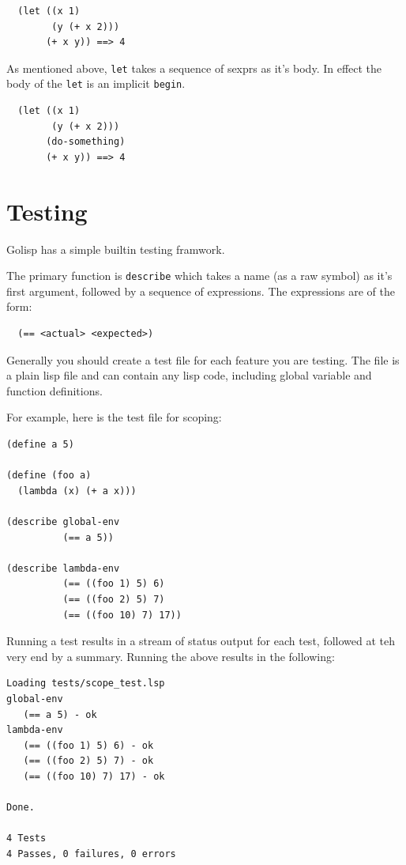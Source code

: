 \documentclass[12pt]{article}
\begin{document}
\begin{verbatim}
  (let ((x 1)
        (y (+ x 2)))
       (+ x y)) ==> 4
\end{verbatim}

As mentioned above, \verb|let| takes a sequence of sexprs as it's
body. In effect the body of the \verb|let| is an implicit
\verb|begin|.

\begin{verbatim}
  (let ((x 1)
        (y (+ x 2)))
       (do-something)
       (+ x y)) ==> 4
\end{verbatim}

\section{Testing}

Golisp has a simple builtin testing framwork.

The primary function is \verb|describe| which takes a name (as a raw
symbol) as it's first argument, followed by a sequence of expressions.
The expressions are of the form:

\begin{verbatim}
  (== <actual> <expected>)
\end{verbatim}

Generally you should create a test file for each feature you are
testing. The file is a plain lisp file and can contain any lisp code,
including global variable and function definitions.

For example, here is the test file for scoping:

\begin{verbatim}
(define a 5)

(define (foo a)
  (lambda (x) (+ a x)))

(describe global-env
          (== a 5))

(describe lambda-env
          (== ((foo 1) 5) 6)
          (== ((foo 2) 5) 7)
          (== ((foo 10) 7) 17))
\end{verbatim}

Running a test results in a stream of status output for each test,
followed at teh very end by a summary.  Running the above results in
the following:

\begin{verbatim}
Loading tests/scope_test.lsp
global-env
   (== a 5) - ok
lambda-env
   (== ((foo 1) 5) 6) - ok
   (== ((foo 2) 5) 7) - ok
   (== ((foo 10) 7) 17) - ok

Done.

4 Tests
4 Passes, 0 failures, 0 errors
\end{verbatim}
\end{document}
